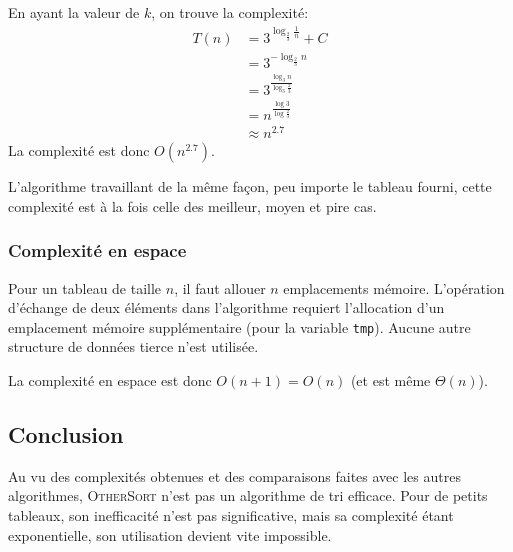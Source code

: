 \documentclass[a4paper, 12pt]{article}
\begin{document}
	En ayant la valeur de \(k\), on trouve la complexité:
	\begin{align*}
	    T\left(n\right) &= 3^{\log_{\frac{2}{3}}\frac{1}{n}} + C\\
	    &= 3^{-\log_{\frac{2}{3}}n}\\
	    &= 3^{\frac{\log_3 n}{\log_3 \frac{2}{3}}}\\
	    &= n^{\frac{\log 3}{\log \frac{2}{3}}}\\
	    &\approx n^{2.7}
	\end{align*}
	La complexité est donc \(O\left(n^{2.7}\right)\).\par
	L'algorithme travaillant de la même façon, peu importe le tableau fourni, cette complexité est à la fois celle des meilleur, moyen et pire cas.
	\subsubsection*{Complexité en espace}
	Pour un tableau de taille \(n\), il faut allouer \(n\) emplacements mémoire. L'opération d'échange de deux éléments dans l'algorithme requiert l'allocation d'un emplacement mémoire supplémentaire (pour la variable \texttt{tmp}). Aucune autre structure de données tierce n'est utilisée.\par
	La complexité en espace est donc \(O\left(n + 1\right) = O\left(n\right)\) (et est même $\Theta(n)$). 
	\subsection{Conclusion}
	Au vu des complexités obtenues et des comparaisons faites avec les autres algorithmes, \textsc{OtherSort} n'est pas un algorithme de tri efficace. Pour de petits tableaux, son inefficacité n'est pas significative, mais sa complexité étant exponentielle, son utilisation devient vite impossible.
\end{document}
